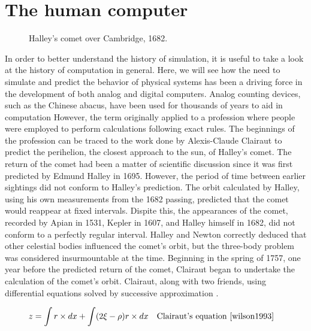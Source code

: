 \documentclass[\rootfolder/main.tex]{subfiles}
\begin{document}
\section{The human computer}

\begin{figure}[ht]
    \caption{Halley's comet over Cambridge, 1682.}
    \label{fig:comet}
\end{figure}

In order to better understand the history of simulation, it is useful to take a look at the history of computation in general.
Here, we will see how the need to simulate and predict the behavior of physical systems has been a driving force in the development of both analog and digital computers.
Analog counting devices, such as the Chinese abacus, have been used for thousands of years to aid in computation
However, the term originally applied to a profession where people were employed to perform calculations following exact rules.
The beginnings of the profession can be traced to the work done by Alexis-Claude Clairaut to predict the perihelion, the closest approach to the sun, of Halley's comet.
The return of the comet had been a matter of scientific discussion since it was first predicted by Edmund Halley in 1695.
However, the period of time between earlier sightings did not conform to Halley's prediction.
The orbit calculated by Halley, using his own measurements from the 1682 passing, predicted that the comet would reappear at fixed intervals.
Dispite this, the appearances of the comet, recorded by Apian in 1531, Kepler in 1607, and Halley himself in 1682, did not conform to a perfectly regular interval.
Halley and Newton correctly deduced that other celestial bodies influenced the comet's orbit, but the three-body problem was considered insurmountable at the time.
Beginning in the spring of 1757, one year before the predicted return of the comet, Clairaut began to undertake the calculation of the comet's orbit.
Clairaut, along with two friends, using differential equations solved by successive approximation \cite{wilson1993}.

\begin{align*} \label{eqn:clairaut}
  z &= \int r \times dx + \int (2 \xi - \rho)r \times dx && \text{Clairaut's equation \cite{wilson1993}}
\end{align*}
\end{document}
